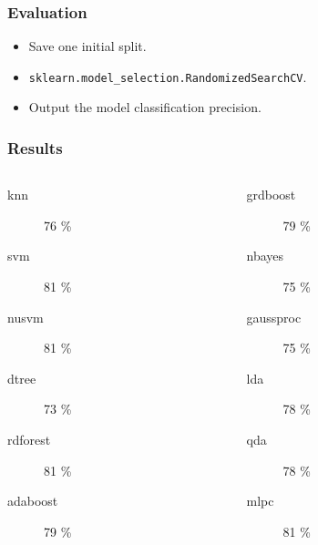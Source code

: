 \documentclass{beamer}
\begin{document}
\begin{frame}
  \frametitle{Evaluation}

  \begin{itemize}
  \item Save one initial split.
  \item \texttt{sklearn.model\_selection.RandomizedSearchCV}.
  \item Output the model classification precision.
  \end{itemize}




\end{frame}

\begin{frame}
  \frametitle{Results}
  \begin{columns}
    \begin{column}{0.5\columnwidth}
      \begin{description}
      \item[knn] 76 \%
      \item[svm] 81 \%
      \item[nusvm] 81 \%
      \item[dtree] 73 \%
      \item[rdforest] 81 \%
      \item[adaboost] 79 \%
      \end{description}
    \end{column}
    \begin{column}{0.5\columnwidth}
      \begin{description}
      \item[grdboost] 79 \%
      \item[nbayes] 75 \%
      \item[gaussproc] 75 \%
      \item[lda] 78 \%
      \item[qda] 78 \%
      \item[mlpc] 81 \%
      \end{description}
    \end{column}
  \end{columns}
\end{frame}
\end{document}
